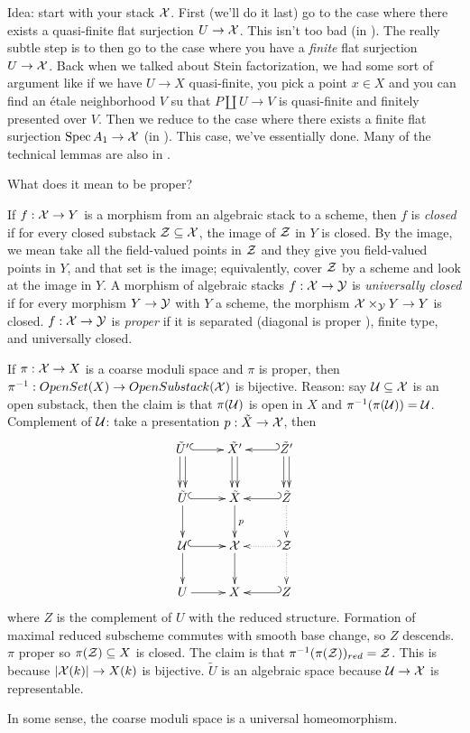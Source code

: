 Idea: start with your stack $\mathcal{X}$. First (we'll do it last) go to the
case where there exists a quasi-finite flat surjection $U\to \mathcal{X}$.
This isn't too bad (in \cite[III]{SGA}). The really subtle step is to
then go to the case where you have a \emph{finite} flat surjection
$U\to \mathcal{X}$. Back when we talked about Stein factorization, we had some
sort of argument like if we have $U\to X$ quasi-finite, you pick a
point $x\in X$ and you can find an \'etale neighborhood $V$ su that
$P\coprod U\to V$ is quasi-finite and finitely presented over $V$.
Then we reduce to the case where there exists a finite flat
surjection $\operatorname{Spec} A_1\to \mathcal{X}$ (in \cite[III]{SGA}). This case, we've
essentially done. Many of the technical lemmas are also in
\cite[III]{SGA}.

What does it mean to be proper?
\begin{definition}
  If $f:\mathcal{X}\to Y$ is a morphism from an algebraic stack to a scheme,
then $f$ is \emph{closed} if for every closed substack $\mathcal{Z}\subseteq
\mathcal{X}$, the image of $\mathcal{Z}$ in $Y$ is closed. By the image, we mean take
all the field-valued points in $\mathcal{Z}$ and they give you field-valued
points in $Y$, and that set is the image; equivalently, cover $\mathcal{Z}$ by
a scheme and look at the image in $Y$. A morphism of algebraic stacks
$f:\mathcal{X}\to \mathcal{Y}$ is \emph{universally closed} if for every morphism $Y\to
\mathcal{Y}$ with $Y$ a scheme, the morphism $\mathcal{X}\times_{\mathcal{Y}} Y\to Y$ is closed.
$f:\mathcal{X}\to \mathcal{Y}$ is \emph{proper} if it is separated (diagonal is proper
), finite type, and universally
closed.
\end{definition}
If $\pi:\mathcal{X}\to X$ is a coarse moduli space and $\pi$ is proper, then
$\pi^{-1}:OpenSet(X)\to OpenSubstack(\mathcal{X})$ is bijective. Reason: say
$\mathcal{U}\subseteq \mathcal{X}$ is an open substack, then the claim is that
$\pi(\mathcal{U})$ is open in $X$ and $\pi^{-1}(\pi(\mathcal{U}))=\mathcal{U}$. Complement of
$\mathcal{U}$: take a presentation $p:\tilde X\to \mathcal{X}$, then
\[\xymatrix{
  \tilde U'\ar@<.5ex>[d]\ar@<-.5ex>[d]\ar@{^(->}[r] & \tilde
X'\ar@<.5ex>[d]\ar@<-.5ex>[d]  & \tilde Z'\ar@{_(->}[l]
\ar@<.5ex>[d]\ar@<-.5ex>[d]\\
  \tilde U\ar@{^(->}[r]\ar[d] & \tilde X\ar[d]^p & \tilde
Z\ar@{_(->}[l] \ar@{.>}[d]\\
  \U\ar@{^(->}[r]\ar[d] & \X\ar[d] & \Z\ar@{_(.>}[l]\ar@{.>}[d]\\
  U\ar[r] & X & Z\ar@{_(->}[l]
}\]
where $Z$ is the complement of $U$ with the reduced structure.
Formation of maximal reduced subscheme commutes with smooth base
change, so $Z$ descends. $\pi$ proper so $\pi(\mathcal{Z})\subseteq X$ is
closed. The claim is that $\pi^{-1}(\pi(\mathcal{Z}))_{red}=\mathcal{Z}$. This is
because $|\mathcal{X}(k)|\to X(k)$ is bijective. $\tilde U$ is an algebraic
space because $\mathcal{U}\to \mathcal{X}$ is representable.

In some sense, the coarse moduli space is a universal homeomorphism.
